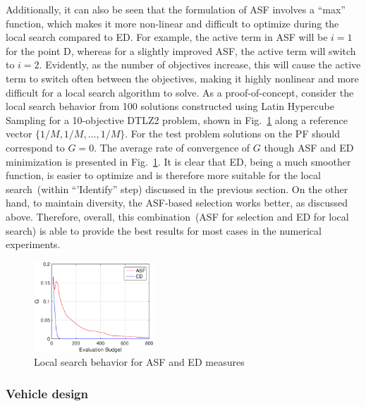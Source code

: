 \documentclass[twocolumn,10pt]{asme2ej}
\begin{document}
Additionally, it can also be seen that the formulation of ASF involves a ``max'' function, which makes it more non-linear and difficult to optimize during the local search compared to ED. For example, the active term in ASF will be $i=1$ for the point D, whereas for a slightly improved ASF, the active term will switch to $i=2$. Evidently, as the number of objectives increase, this will cause the active term to switch often between the objectives, making it highly nonlinear and more difficult for a local search algorithm to solve. As a proof-of-concept, consider the local search behavior from 100 solutions constructed using Latin Hypercube Sampling for a 10-objective DTLZ2 problem, shown in Fig.~\ref{fig:asfedls} along a reference vector $\{1/M, 1/M, \ldots, 1/M\}$. For the test problem solutions on the PF should correspond to $G=0$. The average rate of convergence of $G$ though ASF and ED minimization is presented in Fig.~\ref{fig:asfedls}. It is clear that ED, being a much smoother function, is easier to optimize and is therefore more suitable for the local search~(within ``'Identify'' step) discussed in the previous section. On the other hand, to maintain diversity, the ASF-based selection works better, as discussed above. Therefore, overall, this combination~(ASF for selection and ED for local search) is able to provide the best results for most cases in the numerical experiments.     

\begin{figure}[!htb]
	\centering    
	\includegraphics[width = 0.40\textwidth]{figures/dtlz2asfed-10obj.eps}   
	\caption{Local search behavior for ASF and ED measures}
	\label{fig:asfedls}
\end{figure}


\subsubsection{Vehicle design}
\label{subsubsec:KHTsubsubsec:3}
\end{document}
